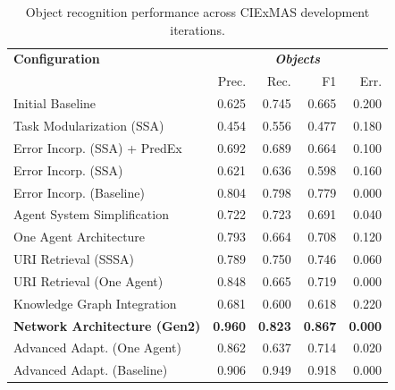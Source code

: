 \documentclass[a4paper,oneside,bibliography=totoc]{scrbook}
\begin{document}
\begin{table}[h]
  \centering
  \begin{tabular}{p{6cm}|rrrr}
    \toprule
    \textbf{Configuration}               & \multicolumn{4}{c}{\textit{\textbf{Objects}}}                                                    \\
                                         & Prec.                                         & Rec.           & F1             & Err.           \\
    \midrule
    Initial Baseline                     & 0.625                                         & 0.745          & 0.665          & 0.200          \\
    Task Modularization (SSA)            & 0.454                                         & 0.556          & 0.477          & 0.180          \\
    Error Incorp. (SSA) + PredEx         & 0.692                                         & 0.689          & 0.664          & 0.100          \\
    Error Incorp. (SSA)                  & 0.621                                         & 0.636          & 0.598          & 0.160          \\
    Error Incorp. (Baseline)             & 0.804                                         & 0.798          & 0.779          & 0.000          \\
    Agent System Simplification          & 0.722                                         & 0.723          & 0.691          & 0.040          \\
    One Agent Architecture               & 0.793                                         & 0.664          & 0.708          & 0.120          \\
    URI Retrieval (SSSA)                 & 0.789                                         & 0.750          & 0.746          & 0.060          \\
    URI Retrieval (One Agent)            & 0.848                                         & 0.665          & 0.719          & 0.000          \\
    Knowledge Graph Integration          & 0.681                                         & 0.600          & 0.618          & 0.220          \\
    \textbf{Network Architecture (Gen2)} & \textbf{0.960}                                & \textbf{0.823} & \textbf{0.867} & \textbf{0.000} \\
    Advanced Adapt. (One Agent)          & 0.862                                         & 0.637          & 0.714          & 0.020          \\
    Advanced Adapt. (Baseline)           & 0.906                                         & 0.949          & 0.918          & 0.000          \\
    \bottomrule
  \end{tabular}
  \caption{Object recognition performance across CIExMAS development iterations.}
  \label{tab:evaluation_objects_iterations}
\end{table}
\end{document}
